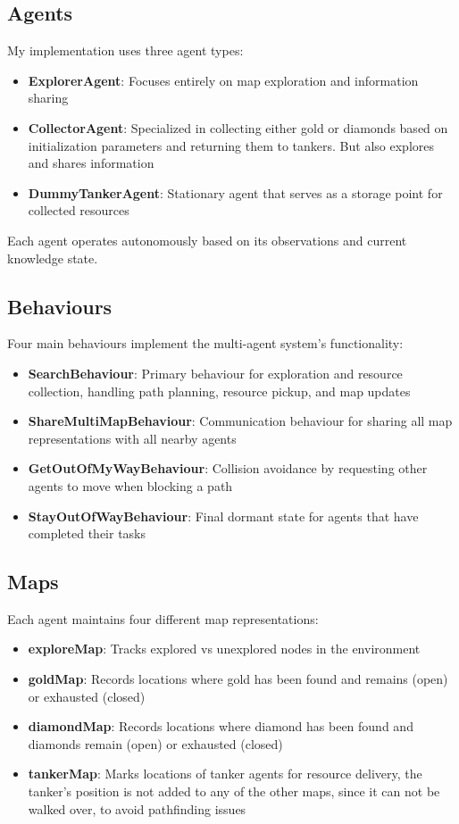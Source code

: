 \documentclass[a4paper, 12pt]{article}
\begin{document}
\subsection{Agents}
My implementation uses three agent types:

\begin{itemize}
  \item \textbf{ExplorerAgent}: Focuses entirely on map exploration and information sharing
  \item \textbf{CollectorAgent}: Specialized in collecting either gold or diamonds based on initialization parameters and returning them to tankers. But also explores and shares information
  \item \textbf{DummyTankerAgent}: Stationary agent that serves as a storage point for collected resources
\end{itemize}

Each agent operates autonomously based on its observations and current knowledge state.

\subsection{Behaviours}
Four main behaviours implement the multi-agent system's functionality:

\begin{itemize}
  \item \textbf{SearchBehaviour}: Primary behaviour for exploration and resource collection, handling path planning, resource pickup, and map updates
  \item \textbf{ShareMultiMapBehaviour}: Communication behaviour for sharing all map representations with all nearby agents
  \item \textbf{GetOutOfMyWayBehaviour}: Collision avoidance by requesting other agents to move when blocking a path
  \item \textbf{StayOutOfWayBehaviour}: Final dormant state for agents that have completed their tasks
\end{itemize}

\subsection{Maps}
Each agent maintains four different map representations:

\begin{itemize}
  \item \textbf{exploreMap}: Tracks explored vs unexplored nodes in the environment
  \item \textbf{goldMap}: Records locations where gold has been found and remains (open) or exhausted (closed)
  \item \textbf{diamondMap}: Records locations where diamond has been found and diamonds remain (open) or exhausted (closed)
  \item \textbf{tankerMap}: Marks locations of tanker agents for resource delivery, the tanker's position is not added to any of the other maps, since it can not be walked over, to avoid pathfinding issues
\end{itemize}
\end{document}
